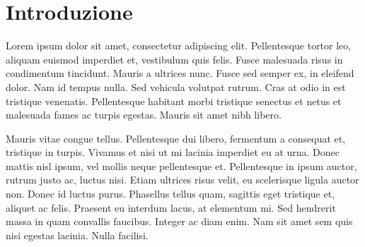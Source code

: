 \chapter{Introduzione}

Lorem ipsum dolor sit amet, consectetur adipiscing elit. Pellentesque tortor leo, aliquam euismod imperdiet et, vestibulum quis felis. Fusce malesuada risus in condimentum tincidunt. Mauris a ultrices nunc. Fusce sed semper ex, in eleifend dolor. Nam id tempus nulla. Sed vehicula volutpat rutrum. Cras at odio in est tristique venenatis. Pellentesque habitant morbi tristique senectus et netus et malesuada fames ac turpis egestas. Mauris sit amet nibh libero.

Mauris vitae congue tellus. Pellentesque dui libero, fermentum a consequat et, tristique in turpis. Vivamus et nisi ut mi lacinia imperdiet eu at urna. Donec mattis nisl ipsum, vel mollis neque pellentesque et. Pellentesque in ipsum auctor, rutrum justo ac, luctus nisi. Etiam ultrices risus velit, eu scelerisque ligula auctor non. Donec id luctus purus. Phasellus tellus quam, sagittis eget tristique et, aliquet ac felis. Praesent eu interdum lacus, at elementum mi. Sed hendrerit massa in quam convallis faucibus. Integer ac diam enim. Nam sit amet sem quis nisi egestas lacinia. Nulla facilisi.

